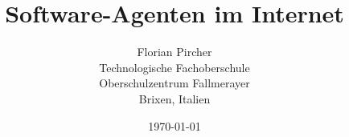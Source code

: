 \title{Software-Agenten im Internet}
\author{
  Florian Pircher\\
  Technologische Fachoberschule\\
  Oberschulzentrum Fallmerayer\\
  Brixen, Italien
}
\date{\today}
\maketitle
